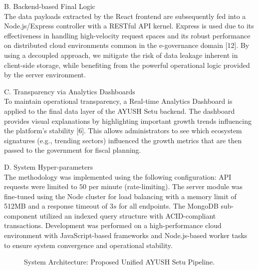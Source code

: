 \documentclass[conference]{IEEEtran}
\begin{document}
B. Backend-based Final Logic\\
The data payloads extracted by the React frontend are subsequently fed into a Node.js/Express controller with a RESTful API kernel. Express is used due to its effectiveness in handling high-velocity request spaces and its robust performance on distributed cloud environments common in the e-governance domain [12]. By using a decoupled approach, we mitigate the risk of data leakage inherent in client-side storage, while benefiting from the powerful operational logic provided by the server environment.

C. Transparency via Analytics Dashboards\\
To maintain operational transparency, a Real-time Analytics Dashboard is applied to the final data layer of the AYUSH Setu backend. The dashboard provides visual explanations by highlighting important growth trends influencing the platform's stability [6]. This allows administrators to see which ecosystem signatures (e.g., trending sectors) influenced the growth metrics that are then passed to the government for fiscal planning.

D. System Hyper-parameters\\
The methodology was implemented using the following configuration: API requests were limited to $50$ per minute (rate-limiting). The server module was fine-tuned using the Node cluster for load balancing with a memory limit of 512MB and a response timeout of $3s$ for all endpoints. The MongoDB sub-component utilized an indexed query structure with ACID-compliant transactions. Development was performed on a high-performance cloud environment with JavaScript-based frameworks and Node.js-based worker tasks to ensure system convergence and operational stability.

\begin{figure}[!t]
\centering
{}
\caption{System Architecture: Proposed Unified AYUSH Setu Pipeline.}
\label{fig:ai_pipeline}
\end{figure}
\end{document}
